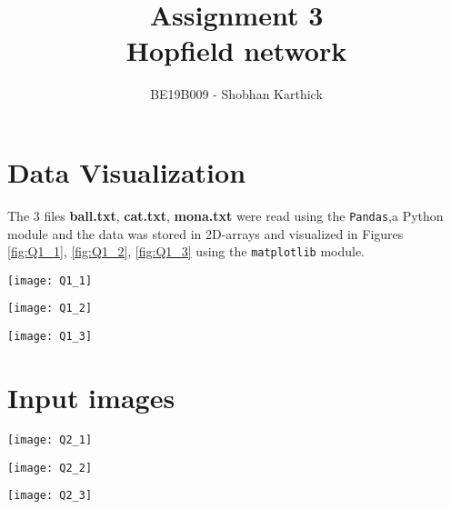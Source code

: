 \documentclass[a4paper, 12pt]{article}
\author{BE19B009 - Shobhan Karthick}
\title{Assignment 3 \\ Hopfield network}
\date{}
\begin{document}
\maketitle

\section{Data Visualization}
\label{visual}

The 3 files \textbf{ball.txt}, \textbf{cat.txt}, \textbf{mona.txt} were read using the \texttt{Pandas},a Python module and the data was stored in 2D-arrays and visualized in Figures \ref{fig:Q1_1}, \ref{fig:Q1_2}, \ref{fig:Q1_3} using the \texttt{matplotlib} module.
\\

\vspace{1 em}
\begin{center}
\begin{minipage}{0.45\linewidth}
    \texttt{[image: Q1\_1]}
    \label{fig:Q1_1}
\end{minipage}
\hfill
\begin{minipage}{0.45\linewidth}
    \texttt{[image: Q1\_2]}
    \label{fig:Q1_2}
\end{minipage}
\vspace{1.5 em}

\begin{minipage}{0.45\linewidth}
    \texttt{[image: Q1\_3]}
    \label{fig:Q1_3}
\end{minipage}
\end{center}

\section{Input images}
\vspace{1 em}
\begin{center}
\begin{minipage}{0.45\linewidth}
    \texttt{[image: Q2\_1]}
    \label{fig:Q1_1}
\end{minipage}
\hfill
\begin{minipage}{0.45\linewidth}
    \texttt{[image: Q2\_2]}
    \label{fig:Q1_2}
\end{minipage}
\vspace{1.5 em}

\begin{minipage}{0.45\linewidth}
    \texttt{[image: Q2\_3]}
    \label{fig:Q1_3}
\end{minipage}
\end{center}
\end{document}
